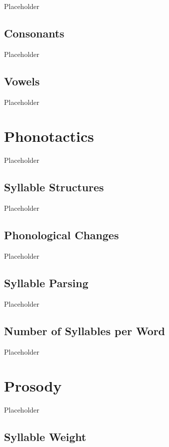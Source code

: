 Placeholder

\subsection{Consonants}
\label{subsec:ank-consonants}

Placeholder

\subsection{Vowels}
\label{subsec:ank-vowels}

Placeholder

\section{\langank{} Phonotactics}
\label{sec:ank-phonotactics}

Placeholder

\subsection{Syllable Structures}
\label{subsec:ank-syll-struc}

Placeholder

\subsection{Phonological Changes}
\label{subsec:ank-phone-changes}

Placeholder

\subsection{Syllable Parsing}
\label{subsec:ank-syll-parse}

Placeholder

\subsection{Number of Syllables per Word}
\label{subsec:ank-num-syll}

Placeholder

\section{\langank{} Prosody}
\label{sec:ank-prosody}

Placeholder

\subsection{Syllable Weight}
\label{subsec:ank-syll-weight}


